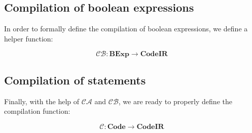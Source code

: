 \documentclass{article}
\begin{document}
\newpage
\subsection{Compilation of boolean expressions}

In order to formally define the compilation of boolean expressions, we define a helper function:

\[
\mathcal{CB}: \textbf{BExp} \rightarrow \textbf{CodeIR}
\]

\begin{table}[h!]
\centering
\renewcommand{\arraystretch}{1.8} 

\end{table}


\newpage
\subsection{Compilation of statements}

Finally, with the help of $\mathcal{CA}$ and $\mathcal{CB}$, we are ready to properly define the compilation function:

\[
\mathcal{C}: \textbf{Code} \rightarrow \textbf{CodeIR}
\]
\end{document}
